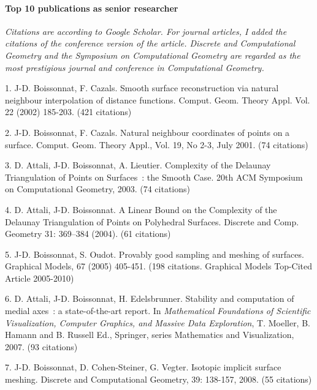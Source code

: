 \paragraph{Top 10 publications as senior researcher}  \mbox{} 

{\em Citations are according to Google Scholar. For journal articles, I added the citations of the conference version of the article. Discrete and Computational Geometry and the Symposium on Computational Geometry are regarded as the most prestigious journal and conference in Computational Geometry.}


1. J-D. Boissonnat, F. Cazals. Smooth surface reconstruction via natural neighbour interpolation of
distance functions.  Comput. Geom. Theory Appl. Vol. 22 (2002) 185-203.  (421 citations)

2.  J-D. Boissonnat, F. Cazals. Natural neighbour coordinates of points on a surface.  
Comput. Geom. Theory Appl., Vol. 19, No 2-3, July 2001. (74 citations)

3. D. Attali, J-D. Boissonnat, A. Lieutier. Complexity of the Delaunay Triangulation of Points on Surfaces~: the 
Smooth Case. 20th  ACM      Symposium on Computational Geometry, 2003. 
(74 citations)

4. D. Attali, J-D. Boissonnat. A Linear Bound on the Complexity of the Delaunay Triangulation of Points on Polyhedral Surfaces.  Discrete and Comp. Geometry 31: 369--384
(2004). (61 citations)

5. J-D. Boissonnat, S. Oudot. Provably good sampling and meshing of surfaces. Graphical Models, 67 (2005) 405-451. (198 citations. Graphical Models Top-Cited Article 2005-2010)

6. D. Attali, J-D. Boissonnat, H. Edelsbrunner. Stability and computation of medial axes~: a state-of-the-art report.
In {\em Mathematical Foundations of Scientific Visualization,
Computer Graphics, and Massive Data Exploration},
T. Moeller,   B. Hamann and B. Russell Ed.,
Springer, series Mathematics and Visualization, 2007. (93 citations)

7. J-D. Boissonnat, D. Cohen-Steiner, G. Vegter. Isotopic implicit surface meshing.  Discrete and Computational Geometry,  39: 138-157,  2008. (55 citations)%

